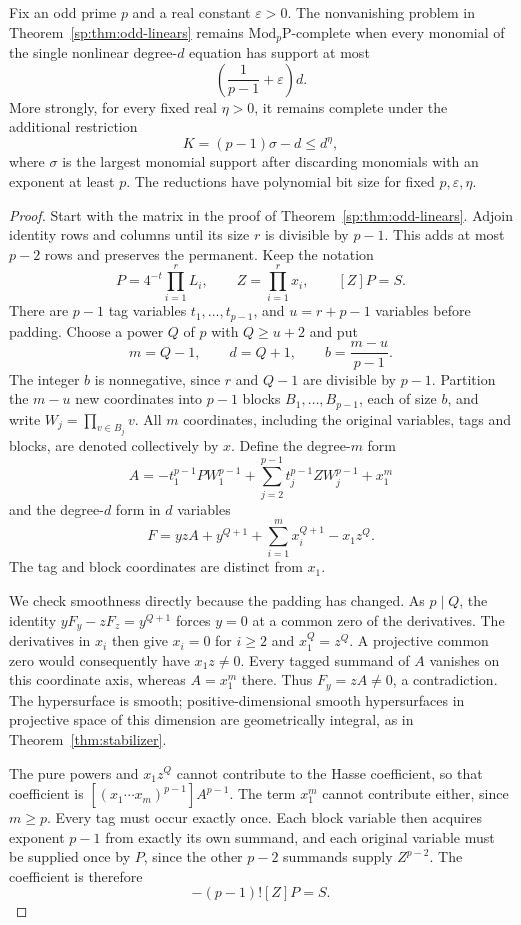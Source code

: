 \begin{theorem}
\label{sp:thm:support-hardness}
Fix an odd prime $p$ and a real constant $\varepsilon>0$.
The nonvanishing problem in Theorem~\ref{sp:thm:odd-linears} remains
$\mathrm{Mod}_p\mathrm P$-complete when every monomial of the single
nonlinear degree-$d$ equation has support at most
\[
 \left(\frac1{p-1}+\varepsilon\right)d.
\]
More strongly, for every fixed real $\eta>0$, it remains complete
under the additional restriction
\[
 K=(p-1)\sigma-d\leq d^\eta,
\]
where $\sigma$ is the largest monomial support after discarding
monomials with an exponent at least $p$. The reductions have
polynomial bit size for fixed $p,\varepsilon,\eta$.
\end{theorem}
\begin{proof}
Start with the matrix in the proof of
Theorem~\ref{sp:thm:odd-linears}. Adjoin identity rows and columns
until its size $r$ is divisible by $p-1$. This adds at most $p-2$
rows and preserves the permanent. Keep the notation
\[
 P=4^{-t}\prod_{i=1}^rL_i,\qquad
 Z=\prod_{i=1}^r x_i,\qquad [Z]P=S.
\]
There are $p-1$ tag variables $t_1,\ldots,t_{p-1}$, and
$u=r+p-1$ variables before padding. Choose a power $Q$ of $p$ with
$Q\geq u+2$ and put
\[
 m=Q-1,\qquad d=Q+1,\qquad
 b=\frac{m-u}{p-1}.
\]
The integer $b$ is nonnegative, since $r$ and $Q-1$ are divisible
by $p-1$. Partition the $m-u$ new coordinates into $p-1$ blocks
$B_1,\ldots,B_{p-1}$, each of size $b$, and write
$W_j=\prod_{v\in B_j}v$. All $m$ coordinates, including the original
variables, tags and blocks, are denoted collectively by $x$.
Define the degree-$m$ form
\[
 A=-t_1^{p-1}P W_1^{p-1}
       +\sum_{j=2}^{p-1}t_j^{p-1}Z W_j^{p-1}+x_1^m
\]
and the degree-$d$ form in $d$ variables
\[
 F=yzA+y^{Q+1}+\sum_{i=1}^m x_i^{Q+1}-x_1z^Q.
\]
The tag and block coordinates are distinct from $x_1$.

We check smoothness directly because the padding has changed.
As $p\mid Q$, the identity
$yF_y-zF_z=y^{Q+1}$ forces $y=0$ at a common zero of the
derivatives. The derivatives in $x_i$ then give $x_i=0$ for $i\geq2$
and $x_1^Q=z^Q$. A projective common zero would consequently have
$x_1z\ne0$. Every tagged summand of $A$ vanishes on this coordinate
axis, whereas $A=x_1^m$ there. Thus $F_y=zA\ne0$, a contradiction.
The hypersurface is smooth; positive-dimensional smooth hypersurfaces
in projective space of this dimension are geometrically integral,
as in Theorem~\ref{thm:stabilizer}.

The pure powers and $x_1z^Q$ cannot contribute to the Hasse coefficient,
so that coefficient is $[(x_1\cdots x_m)^{p-1}]A^{p-1}$.
The term $x_1^m$ cannot contribute either, since $m\geq p$.
Every tag must occur exactly once. Each block variable then acquires
exponent $p-1$ from exactly its own summand, and each original
variable must be supplied once by $P$, since the other $p-2$
summands supply $Z^{p-2}$. The coefficient is therefore
\[
 -(p-1)![Z]P=S.
\]


\end{proof}
